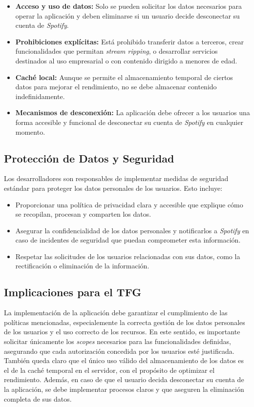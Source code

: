 \begin{itemize}
    \item \textbf{Acceso y uso de datos:} Solo se pueden solicitar los datos necesarios para operar la aplicación y deben eliminarse si un usuario decide desconectar su cuenta de \textit{Spotify}.
    \item \textbf{Prohibiciones explícitas:} Está prohibido transferir datos a terceros, crear funcionalidades que permitan \textit{stream ripping}, o desarrollar servicios destinados al uso empresarial o con contenido dirigido a menores de edad.
    \item \textbf{Caché local:} Aunque se permite el almacenamiento temporal de ciertos datos para mejorar el rendimiento, no se debe almacenar contenido indefinidamente.
    \item \textbf{Mecanismos de desconexión:} La aplicación debe ofrecer a los usuarios una forma accesible y funcional de desconectar su cuenta de \textit{Spotify} en cualquier momento.
\end{itemize}

\subsection{Protección de Datos y Seguridad}

Los desarrolladores son responsables de implementar medidas de seguridad estándar para proteger los datos personales de los usuarios. Esto incluye:

\begin{itemize}
    \item Proporcionar una política de privacidad clara y accesible que explique cómo se recopilan, procesan y comparten los datos.
    \item Asegurar la confidencialidad de los datos personales y notificarlos a \textit{Spotify} en caso de incidentes de seguridad que puedan comprometer esta información.
    \item Respetar las solicitudes de los usuarios relacionadas con sus datos, como la rectificación o eliminación de la información.
\end{itemize}

\subsection{Implicaciones para el TFG}

La implementación de la aplicación debe garantizar el cumplimiento de las políticas mencionadas, especialemente la correcta gestión de los datos personales de los usuarios y el uso correcto de los recursos. En este sentido, es importante solicitar únicamente los \textit{scopes} necesarios para las funcionalidades definidas, asegurando que cada autorización concedida por los usuarios esté justificada. También queda claro que el único uso válido del almacenamiento de los datos es el de la caché temporal en el servidor, con el propósito de optimizar el rendimiento. Además, en caso de que el usuario decida desconectar su cuenta de la aplicación, se debe implementar procesos claros y que aseguren la eliminación completa de sus datos.

